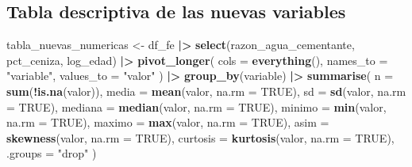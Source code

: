 \documentclass[
]{book}
\newenvironment{Shaded}{\begin{snugshade}}{\end{snugshade}}
\newcommand{\AttributeTok}[1]{\textcolor[rgb]{0.13,0.29,0.53}{#1}}
\newcommand{\ConstantTok}[1]{\textcolor[rgb]{0.56,0.35,0.01}{#1}}
\newcommand{\FunctionTok}[1]{\textcolor[rgb]{0.13,0.29,0.53}{\textbf{#1}}}
\newcommand{\NormalTok}[1]{#1}
\newcommand{\OtherTok}[1]{\textcolor[rgb]{0.56,0.35,0.01}{#1}}
\newcommand{\SpecialCharTok}[1]{\textcolor[rgb]{0.81,0.36,0.00}{\textbf{#1}}}
\newcommand{\StringTok}[1]{\textcolor[rgb]{0.31,0.60,0.02}{#1}}
\begin{document}
\subsection{Tabla descriptiva de las nuevas variables}\label{tabla-descriptiva-de-las-nuevas-variables}

\begin{Shaded}
\begin{Highlighting}[]
\NormalTok{tabla\_nuevas\_numericas }\OtherTok{\textless{}{-}}\NormalTok{ df\_fe }\SpecialCharTok{|\textgreater{}}
  \FunctionTok{select}\NormalTok{(razon\_agua\_cementante, pct\_ceniza, log\_edad) }\SpecialCharTok{|\textgreater{}}
  \FunctionTok{pivot\_longer}\NormalTok{(}
    \AttributeTok{cols =} \FunctionTok{everything}\NormalTok{(),}
    \AttributeTok{names\_to =} \StringTok{"variable"}\NormalTok{,}
    \AttributeTok{values\_to =} \StringTok{"valor"}
\NormalTok{  ) }\SpecialCharTok{|\textgreater{}}
  \FunctionTok{group\_by}\NormalTok{(variable) }\SpecialCharTok{|\textgreater{}}
  \FunctionTok{summarise}\NormalTok{(}
    \AttributeTok{n =} \FunctionTok{sum}\NormalTok{(}\SpecialCharTok{!}\FunctionTok{is.na}\NormalTok{(valor)),}
    \AttributeTok{media =} \FunctionTok{mean}\NormalTok{(valor, }\AttributeTok{na.rm =} \ConstantTok{TRUE}\NormalTok{),}
    \AttributeTok{sd =} \FunctionTok{sd}\NormalTok{(valor, }\AttributeTok{na.rm =} \ConstantTok{TRUE}\NormalTok{),}
    \AttributeTok{mediana =} \FunctionTok{median}\NormalTok{(valor, }\AttributeTok{na.rm =} \ConstantTok{TRUE}\NormalTok{),}
    \AttributeTok{minimo =} \FunctionTok{min}\NormalTok{(valor, }\AttributeTok{na.rm =} \ConstantTok{TRUE}\NormalTok{),}
    \AttributeTok{maximo =} \FunctionTok{max}\NormalTok{(valor, }\AttributeTok{na.rm =} \ConstantTok{TRUE}\NormalTok{),}
    \AttributeTok{asim =} \FunctionTok{skewness}\NormalTok{(valor, }\AttributeTok{na.rm =} \ConstantTok{TRUE}\NormalTok{),}
    \AttributeTok{curtosis =} \FunctionTok{kurtosis}\NormalTok{(valor, }\AttributeTok{na.rm =} \ConstantTok{TRUE}\NormalTok{),}
    \AttributeTok{.groups =} \StringTok{"drop"}
\NormalTok{  )}


\end{Highlighting}
\end{Shaded}
\end{document}
